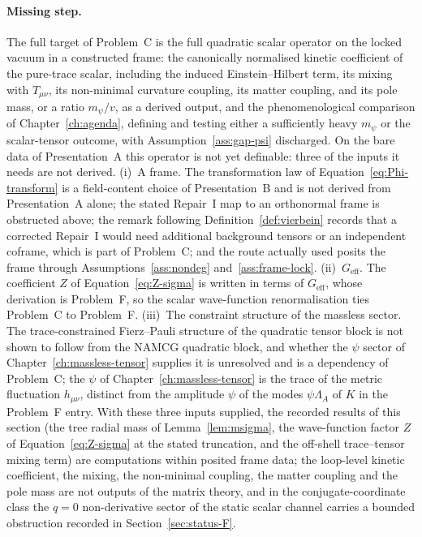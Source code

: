 \paragraph{Missing step.} The full target of Problem~C is the full quadratic scalar operator on the locked vacuum in a constructed frame: the canonically normalised kinetic coefficient of the pure-trace scalar, including the induced Einstein--Hilbert term, its mixing with \(T_{\mu\nu}\), its non-minimal curvature coupling, its matter coupling, and its pole mass, or a ratio \(m_\psi/v\), as a derived output, and the phenomenological comparison of Chapter~\ref{ch:agenda}, defining and testing either a sufficiently heavy \(m_\psi\) or the scalar-tensor outcome, with Assumption~\ref{ass:gap-psi} discharged. On the bare data of Presentation~A this operator is not yet definable: three of the inputs it needs are not derived. (i)~A frame. The transformation law of Equation~\eqref{eq:Phi-transform} is a field-content choice of Presentation~B and is not derived from Presentation~A alone; the stated Repair~I map to an orthonormal frame is obstructed above; the remark following Definition~\ref{def:vierbein} records that a corrected Repair~I would need additional background tensors or an independent coframe, which is part of Problem~C; and the route actually used posits the frame through Assumptions~\ref{ass:nondeg} and~\ref{ass:frame-lock}. (ii)~\(G_{\mathrm{eff}}\). The coefficient \(Z\) of Equation~\eqref{eq:Z-sigma} is written in terms of \(G_{\mathrm{eff}}\), whose derivation is Problem~F, so the scalar wave-function renormalisation ties Problem~C to Problem~F. (iii)~The constraint structure of the massless sector. The trace-constrained Fierz--Pauli structure of the quadratic tensor block is not shown to follow from the NAMCG quadratic block, and whether the \(\psi\) sector of Chapter~\ref{ch:massless-tensor} supplies it is unresolved and is a dependency of Problem~C; the \(\psi\) of Chapter~\ref{ch:massless-tensor} is the trace of the metric fluctuation \(h_{\mu\nu}\), distinct from the amplitude \(\psi\) of the modes \(\psi\Lambda_A\) of \(K\) in the Problem~F entry. With these three inputs supplied, the recorded results of this section (the tree radial mass of Lemma~\ref{lem:msigma}, the wave-function factor \(Z\) of Equation~\eqref{eq:Z-sigma} at the stated truncation, and the off-shell trace--tensor mixing term) are computations within posited frame data; the loop-level kinetic coefficient, the mixing, the non-minimal coupling, the matter coupling and the pole mass are not outputs of the matrix theory, and in the conjugate-coordinate class the \(q=0\) non-derivative sector of the static scalar channel carries a bounded obstruction recorded in Section~\ref{sec:status-F}.